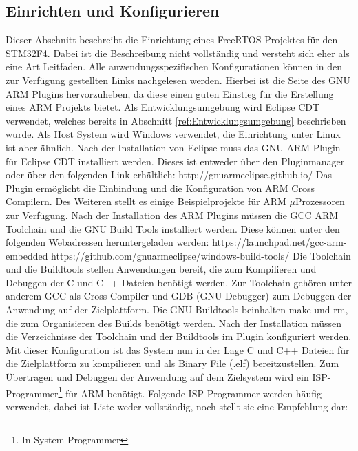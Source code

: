 \subsection{Einrichten und Konfigurieren}
\label{sec:Einrichtung und Konfiguration}
Dieser Abschnitt beschreibt die Einrichtung eines FreeRTOS Projektes für den STM32F4. Dabei ist die Beschreibung nicht vollständig und versteht sich eher als eine Art Leitfaden. Alle anwendungsspezifischen Konfigurationen können in den zur Verfügung gestellten Links nachgelesen werden. Hierbei ist die Seite des GNU ARM Plugins hervorzuheben, da diese einen guten Einstieg für die Erstellung eines ARM Projekts bietet. Als Entwicklungsumgebung wird Eclipse CDT verwendet, welches bereits in Abschnitt \ref{ref:Entwicklungsumgebung} beschrieben wurde. Als Host System wird Windows verwendet, die Einrichtung unter Linux ist aber ähnlich. Nach der Installation von Eclipse muss das GNU ARM Plugin für Eclipse CDT installiert werden. Dieses ist entweder über den Pluginmanager oder über den folgenden Link erhältlich: 
\newline
\newline
http://gnuarmeclipse.github.io/
\newline
\newline
Das Plugin ermöglicht die Einbindung und die Konfiguration von ARM Cross Compilern. Des Weiteren stellt es einige Beispielprojekte für ARM $\mu$Prozessoren zur Verfügung. Nach der Installation des ARM Plugins müssen die GCC ARM Toolchain und die GNU Build Tools installiert werden. 
Diese können unter den folgenden Webadressen heruntergeladen werden: 
\newline
\newline
https://launchpad.net/gcc-arm-embedded
\newline
https://github.com/gnuarmeclipse/windows-build-tools/
\newline
\newline
Die Toolchain und die Buildtools stellen Anwendungen bereit, die zum Kompilieren und Debuggen der C und C++ Dateien benötigt werden. Zur Toolchain gehören unter anderem GCC als Cross Compiler und GDB (GNU Debugger) zum Debuggen der Anwendung auf der Zielplattform. Die GNU Buildtools beinhalten make und rm, die zum Organisieren des Builds benötigt werden. Nach der Installation müssen die Verzeichnisse der Toolchain und der Buildtools im Plugin konfiguriert werden. Mit dieser Konfiguration ist das System nun in der Lage C und C++ Dateien für die Zielplattform zu kompilieren und als Binary File (.elf) bereitzustellen. Zum Übertragen und Debuggen der Anwendung auf dem Zielsystem wird ein ISP-Programmer\footnote{In System Programmer} für ARM benötigt. Folgende ISP-Programmer werden häu\-fig verwendet, dabei ist Liste weder vollständig, noch stellt sie eine Empfehlung dar:

